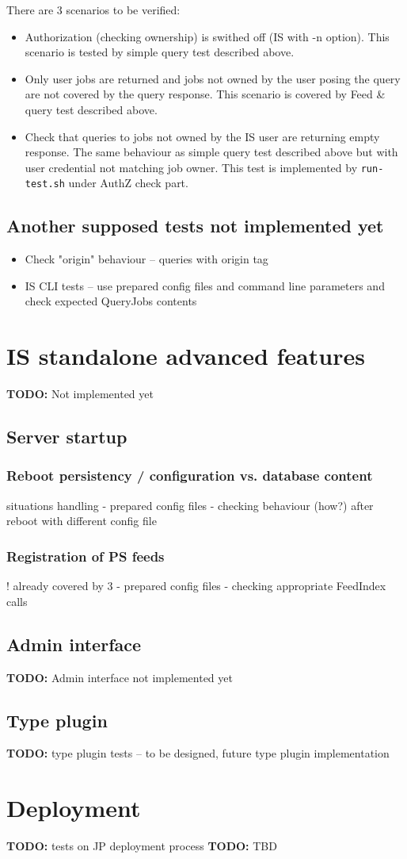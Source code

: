 \documentclass{egee}
\def\todo#1{\textbf{TODO:} #1}
\begin{document}
There are 3 scenarios to be verified:
\begin{itemize}
 \item Authorization (checking ownership) is swithed off (IS with -n
   option). This scenario is tested by simple query test described above.
 \item Only user jobs are returned and jobs not owned by the user posing
   the query are not covered by the query response. This scenario is
   covered by Feed \& query test described above.
 \item Check that queries to jobs not owned by the IS user are
   returning empty response. The same behaviour as simple query test
   described above but with user credential not matching job
   owner. This test is implemented by \texttt{run-test.sh} under AuthZ
   check part.
\end{itemize}

\subsection{Another supposed tests not implemented yet}

\begin{itemize}
 \item Check "origin" behaviour -- queries with origin tag
 \item IS CLI tests -- use prepared config files and command line parameters
  and check expected QueryJobs contents
\end{itemize}


\section{IS standalone advanced features}
\todo{Not implemented yet}

\subsection{Server startup}

\subsubsection{Reboot persistency / configuration vs. database content}
    situations handling
- prepared config files
- checking behaviour (how?) after reboot with different config file

\subsubsection{Registration of PS feeds}
! already covered by 3
- prepared config files
- checking appropriate FeedIndex calls

\subsection{Admin interface}
\todo{Admin interface not implemented yet}

\subsection{Type plugin}
\todo{type plugin tests -- to be designed, future type plugin implementation}

\section{Deployment}
\todo{tests on JP deployment process}
\todo{TBD}
\end{document}
